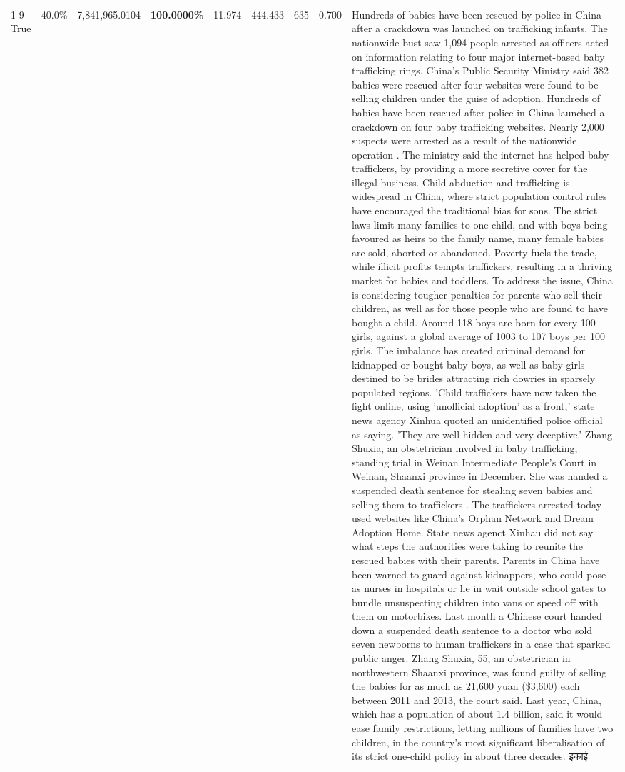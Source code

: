 \begin{table}[H]
\begin{tabular}{lllrlllll}
\cline{1-9}
True & 40.0\% & 7,841,965.0104 & \bfseries \color{red} 100.0000\% & 11.974 & 444.433 & 635 & 0.700 & Hundreds of babies have been rescued by police in China after a crackdown was launched on trafficking infants. The nationwide bust saw 1,094 people arrested as officers acted on information relating to four major internet-based baby trafficking rings. China's Public Security Ministry said 382 babies were rescued after four websites were found to be selling children under the guise of adoption. Hundreds of babies have been rescued after police in China launched a crackdown on four baby trafficking websites. Nearly 2,000 suspects were arrested as a result of the nationwide operation . The ministry said the internet has helped baby traffickers, by providing a more secretive cover for the illegal business. Child abduction and trafficking is widespread in China, where strict population control rules have encouraged the traditional bias for sons. The strict laws limit many families to one child, and with boys being favoured as heirs to the family name, many female babies are sold, aborted or abandoned. Poverty fuels the trade, while illicit profits tempts traffickers, resulting in a thriving market for babies and toddlers. To address the issue, China is considering tougher penalties for parents who sell their children, as well as for those people who are found to have bought a child. Around 118 boys are born for every 100 girls, against a global average of 1003 to 107 boys per 100 girls. The imbalance has created criminal demand for kidnapped or bought baby boys, as well as baby girls destined to be brides attracting rich dowries in sparsely populated regions. 'Child traffickers have now taken the fight online, using 'unofficial adoption' as a front,' state news agency Xinhua quoted an unidentified police official as saying. 'They are well-hidden and very deceptive.' Zhang Shuxia, an obstetrician involved in baby trafficking, standing trial in Weinan Intermediate People's Court in Weinan, Shaanxi province in December. She was handed a suspended death sentence for stealing seven babies and selling them to traffickers . The traffickers arrested today used websites like China's Orphan Network and Dream Adoption Home. State news agenct Xinhau did not say what steps the authorities were taking to reunite the rescued babies with their parents. Parents in China have been warned to guard against kidnappers, who could pose as nurses in hospitals or lie in wait outside school gates to bundle unsuspecting children into vans or speed off with them on motorbikes. Last month a Chinese court handed down a suspended death sentence to a doctor who sold seven newborns to human traffickers in a case that sparked public anger. Zhang Shuxia, 55, an obstetrician in northwestern Shaanxi province, was found guilty of selling the babies for as much as 21,600 yuan (\$3,600) each between 2011 and 2013, the court said. Last year, China, which has a population of about 1.4 billion, said it would ease family restrictions, letting millions of families have two children, in the country's most significant liberalisation of its strict one-child policy in about three decades. इकाई \\

\end{tabular}
\end{table}
